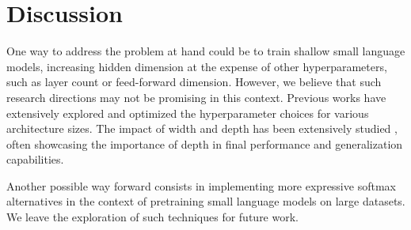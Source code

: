 
\section{Discussion}


One way to address the problem at hand could be to train shallow small language models, increasing hidden dimension at the expense of other hyperparameters, such as layer count or feed-forward dimension. However, we believe that such research directions may not be promising in this context. Previous works have extensively explored and optimized the hyperparameter choices for various architecture sizes. The impact of width and depth has been extensively studied \citep{merrill-etal-2022-saturated, tay2022scale, petty2023impact}, often showcasing the importance of depth in final performance and generalization capabilities.

Another possible way forward consists in implementing more expressive softmax alternatives \citep{softmax_bottleneck,chang-mccallum-2022-softmax} in the context of pretraining small language models on large datasets. We leave the exploration of such techniques for future work.

